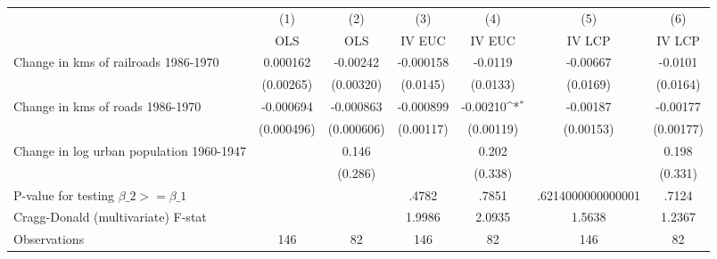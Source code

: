 {
\def\sym#1{\ifmmode^{#1}\else\(^{#1}\)\fi}
\begin{tabular}{l*{6}{c}}
\hline\hline
                &\multicolumn{1}{c}{(1)}&\multicolumn{1}{c}{(2)}&\multicolumn{1}{c}{(3)}&\multicolumn{1}{c}{(4)}&\multicolumn{1}{c}{(5)}&\multicolumn{1}{c}{(6)}\\
                &\multicolumn{1}{c}{OLS}&\multicolumn{1}{c}{OLS}&\multicolumn{1}{c}{IV EUC}&\multicolumn{1}{c}{IV EUC}&\multicolumn{1}{c}{IV LCP}&\multicolumn{1}{c}{IV LCP}\\
\hline
Change in kms of railroads 1986-1970& 0.000162         & -0.00242         &-0.000158         &  -0.0119         & -0.00667         &  -0.0101         \\
                &(0.00265)         &(0.00320)         & (0.0145)         & (0.0133)         & (0.0169)         & (0.0164)         \\
[1em]
Change in kms of roads 1986-1970&-0.000694         &-0.000863         &-0.000899         & -0.00210\sym{*}  & -0.00187         & -0.00177         \\
                &(0.000496)         &(0.000606)         &(0.00117)         &(0.00119)         &(0.00153)         &(0.00177)         \\
[1em]
Change in log urban population 1960-1947&                  &    0.146         &                  &    0.202         &                  &    0.198         \\
                &                  &  (0.286)         &                  &  (0.338)         &                  &  (0.331)         \\
\hline
P-value for testing $\beta\_{2} >= \beta\_{1}$&                  &                  &    .4782         &    .7851         &.6214000000000001         &    .7124         \\
Cragg-Donald (multivariate) F-stat&                  &                  &   1.9986         &   2.0935         &   1.5638         &   1.2367         \\
Observations    &      146         &       82         &      146         &       82         &      146         &       82         \\
\hline\hline
\end{tabular}
}
